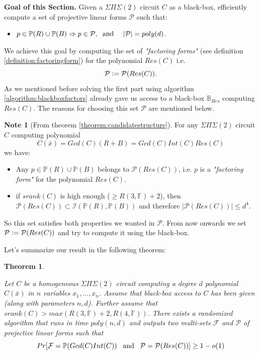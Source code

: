 \documentclass[12pt]{caltech_thesis}
\theoremstyle{plain}
\newtheorem{theorem}{Theorem}
\theoremstyle{definition}
\newtheorem{note}{Note}
\newcommand{\defeq}{\vcentcolon=}
\newcommand{\F}{\mathbb{F}}
\newcommand{\MP}{\mathcal{P}}
\newcommand{\MF}{\mathcal{F}}
\newcommand{\MI}{\mathcal{I}}
\newcommand{\CB}{\mathbb{B}}
\newcommand{\PP}{\mathbb{P}}
\newcommand{\B}[1]{\bar{#1}}
\begin{document}
 \textbf{Goal of this Section. } Given a $\Sigma\Pi\Sigma(2)$ circuit $C$ as a black-box,
 efficiently compute a set of   projective linear forms $\MP$  such that:
 \begin{itemize}
  \renewcommand\labelitemi{--}
  \item $p \in \PP(R)\cup \PP(B) \Rightarrow p\in \MP, \hspace{0.25em}\text{ and }\hspace{1em}|\MP| = poly(d)$.
 \end{itemize}

 
We achieve this goal by computing the set of \emph{"factoring forms"} 
(see definition \ref{definition:factoringform}) for the polynomial $Res(C)$ i.e.
\[
\MP \defeq \MP(Res(C)).
\]
As we mentioned before solving the first part using algorithm \ref{algorithm:blackboxfactors} already gave us access to a black-box $\CB_{Res}$
computing $Res(C)$. The reasons for choosing this set $\MP$ are mentioned below.

\begin{note}[From theorem \ref{theorem:candidatestructure}]\label{note:candidatestructure}
 For any $\Sigma\Pi\Sigma(2)$ circuit $C$ computing polynomial \[C(\B{x}) = Gcd(C)(R+B) = Gcd(C)Int(C)Res(C)\]
 we have:
 \begin{itemize}
 \item Any $p\in \PP(R)\cup \PP(B)$ belongs to $\MP(Res(C))$, i.e. $p$ is a \emph{"factoring form"} for the polynomial
 $Res(C)$.

 \item  if $srank(C)$ is high enough ($\geq R(3,\F)+2$), then $\MP(Res(C))\subset \MI(\PP(R),\PP(B))$ and therefore 
 $|\MP(Res(C))|\leq d^4.$

 \end{itemize}
\end{note}
So this set satisfies both properties we wanted in $\MP$. From now onwards we set $\MP \defeq \MP(Res(C))$ and try to
compute it using the black-box.



Let's summarize our result in the following theorem:

\begin{theorem}\label{theorem:stepone}

Let $C$ be a homogeneous $\Sigma\Pi\Sigma(2)$ circuit computing a degree $d$ polynomial $C(\B{x})$ in $n$ variables $x_1,\ldots,x_n$. 
Assume that black-box access to 
$C$ has been given (along with parameters $n,d$).
Further assume that $srank(C)>  max(R(3,\F)+2,R(4,\F))$. There exists a randomized algorithm that runs in time 
 $poly(n,d)$ and  outputs two multi-sets $\MF$ and $\MP$ of projective linear forms such that
 \[
  Pr[ \MF = \PP(Gcd(C)Int(C))\hspace{0.5em} \text{ and }\hspace{0.5em} \MP = \MP(Res(C)) ]\geq 1-o(1) 
 \]
\end{theorem}
\end{document}
